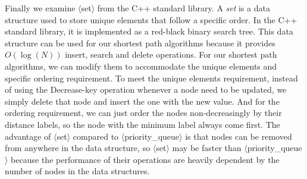 Finally we examine $\langle$set$\rangle$ from the C++ standard library.
A \emph{set} is a data structure used to store unique elements that follow a specific order.
In the C++ standard library, it is implemented as a red-black binary search tree.
This data structure can be used for our shortest path algorithms because it provides $O(\log(N))$ insert, search and delete operations.
For our shortest path algorithms,
we can modify them to accommodate the unique elements and specific ordering requirement.
To meet the unique elements requirement,
instead of using the Decrease-key operation whenever a node need to be updated,
we simply delete that node and insert the one with the new value.
And for the ordering requirement,
we can just order the nodes non-decreasingly by their distance labels,
so the node with the minimum label always come first.
The advantage of $\langle$set$\rangle$ compared to $\langle$priority\_queue$\rangle$ is that nodes can be removed from anywhere in the data structure,
so $\langle$set$\rangle$ may be faster than $\langle$priority\_queue$\rangle$ because the performance of their operations are heavily dependent by the number of nodes in the data structures.
